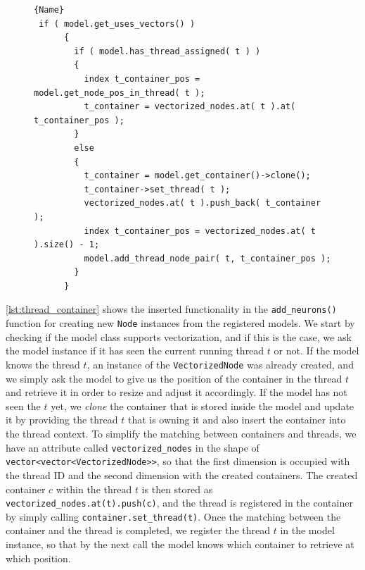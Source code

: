 \begin{figure}[ht!]
    \centering
\begin{lstlisting}[caption=Assigning containers to threads,frame=tlrb, label=lst:thread_container]{Name}
 if ( model.get_uses_vectors() )
      {
        if ( model.has_thread_assigned( t ) )
        {
          index t_container_pos = model.get_node_pos_in_thread( t );
          t_container = vectorized_nodes.at( t ).at( t_container_pos );
        }
        else
        {
          t_container = model.get_container()->clone();
          t_container->set_thread( t );
          vectorized_nodes.at( t ).push_back( t_container );
          index t_container_pos = vectorized_nodes.at( t ).size() - 1;
          model.add_thread_node_pair( t, t_container_pos );
        }
      }
\end{lstlisting}
\end{figure}

\autoref{lst:thread_container} shows the inserted functionality in the \texttt{add\_neurons()} function for creating new \texttt{Node} instances from the registered models. We start by checking if the model class supports vectorization, and if this is the case, we ask the model instance if it has seen the current running thread $t$ or not. If the model knows the thread $t$, an instance of the \texttt{VectorizedNode} was already created, and we simply ask the model to give us the position of the container in the thread $t$ and retrieve it in order to resize and adjust it accordingly. If the model has not seen the $t$ yet, we \emph{clone} the container that is stored inside the model and update it by providing the thread $t$ that is owning it and also insert the container into the thread context. To simplify the matching between containers and threads, we have an attribute called \texttt{vectorized\_nodes} in the shape of \texttt{vector<vector<VectorizedNode>>}, so that the first dimension is occupied with the thread ID and the second dimension with the created containers. The created container $c$ within the thread $t$ is then stored as \texttt{vectorized\_nodes.at(t).push(c)}, and the thread is registered in the container by simply calling \texttt{container.set\_thread(t)}. Once the matching between the container and the thread is completed, we register the thread $t$ in the model instance, so that by the next call the model knows which container to retrieve at which position.


